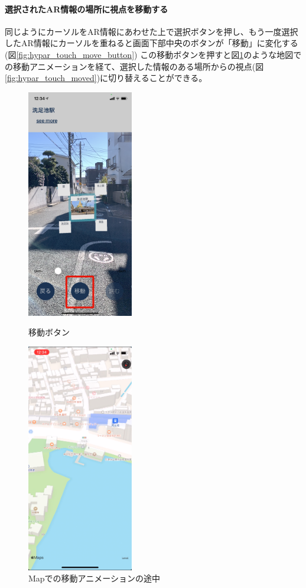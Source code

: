 \paragraph*{選択されたAR情報の場所に視点を移動する}
同じようにカーソルをAR情報にあわせた上で選択ボタンを押し、もう一度選択したAR情報にカーソルを重ねると画面下部中央のボタンが「移動」に変化する(図\ref{fig:hypar_touch_move_button})
この移動ボタンを押すと図\ref{fig:hypar_touch_move_map}のような地図での移動アニメーションを経て、選択した情報のある場所からの視点(図\ref{fig:hypar_touch_moved})に切り替えることができる。

\begin{figure}[h]
  \begin{minipage}{0.5\hsize}
    \centering
    \includegraphics[height=100mm]{images/hypar_touch_move_button.png}
    \caption{移動ボタン} \label{fig:hypar_touch_move_button}
  \end{minipage}
  \begin{minipage}{0.5\hsize}
    \centering
    \includegraphics[height=100mm]{images/hypar_touch_move_map.png}
    \caption{Mapでの移動アニメーションの途中} \label{fig:hypar_touch_move_map}
  \end{minipage}
\end{figure}

